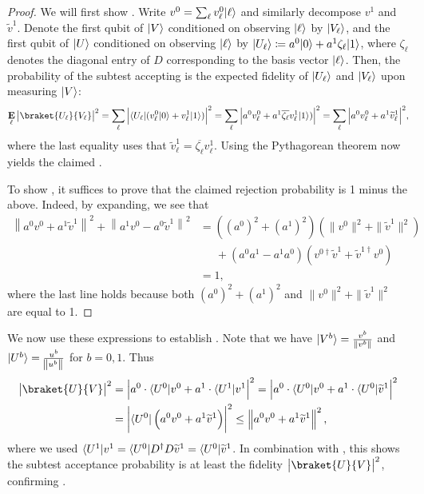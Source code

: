 \begin{proof}
We will first show . Write $v^0= \sum_\ell v^0_\ell \lvert\ell\rangle$ and similarly decompose $v^1$ and $\widetilde{v}^1$. Denote the first qubit of $\lvert V\rangle$ conditioned on observing $\lvert\ell\rangle$ by $ \lvert V_\ell\rangle$, and the first qubit of $\lvert U\rangle$ conditioned on observing $\lvert\ell\rangle$ by $ \lvert U_\ell\rangle \coloneqq a^0\lvert0\rangle + a^1\zeta_\ell \lvert1\rangle$, where $\zeta_\ell$ denotes the diagonal entry of $D$ corresponding to the basis vector $\lvert\ell\rangle$. Then, the probability of the subtest  accepting is the expected fidelity of $\lvert U_\ell\rangle$ and $\lvert V_\ell\rangle$ upon measuring $\lvert V\rangle$:
\[
     \mathop{\E}_\ell \abs{ \braket{U_\ell}{V_\ell} }^2 = \sum_\ell \abs{ \bra{U_\ell}(v^0_\ell\ket{0} + v^1_\ell\ket{1}) }^2 = \sum_\ell \abs{ a^0v^0_\ell + a^1 \overline{\zeta_\ell} v^1_\ell\ket{1}) }^2 =  \sum_\ell \abs{ a^0v^0_\ell + a^1 \widetilde{v}^1_\ell }^2,
\]
where the last equality uses that $\widetilde{v}^1_\ell = \overline{\zeta_\ell}v^1_\ell$. Using the Pythagorean theorem now yields the claimed .

To show , it suffices to prove that the claimed rejection probability is 1 minus the above. Indeed, by expanding, we see that
\begin{align*}
    \left\|a^0 v^0 + a^1 \widetilde{v}^1\right\|^2 + \left\|a^1 v^0 - a^0 \widetilde{v}^1\right\|^2 &= \left( (a^0)^2+(a^1)^2 \right) \left( \| v^0 \|^2 + \| \widetilde{v}^1 \|^2 \right) \\
    &\quad~~ + \left( a^0a^1-a^1a^0 \right) \left( v^{0\dag} \widetilde{v}^1 + \widetilde{v}^{1\dag} v^0 \right)\\
    &= 1,
\end{align*}
where the last line holds because both $(a^0)^2+(a^1)^2$ and $\| v^0 \|^2 + \| \widetilde{v}^1 \|^2$ are equal to 1.
\end{proof}

    We now use these expressions to establish . Note that we have $\lvert V^b\rangle = \frac{v^b}{\|v^b\|}$ and $\lvert U^b\rangle = \frac{u^b}{\norm{u^b}}$ for $b = 0, 1$.
    Thus
    \begin{align*}
        \abs{\braket{U}{V}}^2 
        &= \left|a^0\cdot \bra{U^0}v^0 + a^1\cdot \bra{U^1}v^1\right|^2 
        = \left|a^0\cdot \bra{U^0}v^0 + a^1\cdot \bra{U^0}\widetilde{v}^1\right|^2\\
        &= \left|\bra{U^0}\left(a^0 v^0 + a^1 \widetilde{v}^1\right)\right|^2
        \leq \left\|a^0 v^0+a^1 \widetilde{v}^1\right\|^2, \label{eqn:expre}
    \end{align*}
    where we used $\langle U^1\rvert v^1 = \langle U^0\rvert D^\dagger D \widetilde{v}^1 = \langle U^0\rvert\widetilde{v}^1$.
    In combination with , this shows the subtest acceptance probability is at least the fidelity $\abs{\braket{U}{V}}^2$, confirming . 
    
